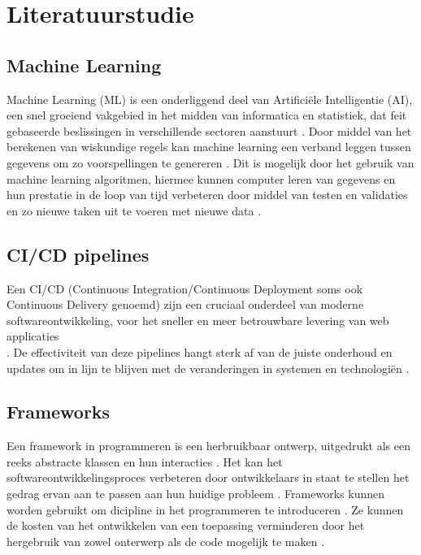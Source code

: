 
\section{Literatuurstudie}%
\label{sec:state-of-the-art}

\subsection{Machine Learning}
Machine Learning (ML) is een onderliggend deel van Artificiële Intelligentie (AI), een snel groeiend vakgebied in het midden van informatica en statistiek, dat feit gebaseerde beslissingen in verschillende sectoren aanstuurt \autocite{Jordan2015}.
Door middel van het berekenen van wiskundige regels kan machine learning een verband leggen tussen gegevens om zo voorspellingen te genereren \autocite{Cybenko2001}.
Dit is mogelijk door het gebruik van machine learning algoritmen, hiermee kunnen computer leren van gegevens en hun prestatie in de loop van tijd verbeteren door middel van testen en validaties en zo nieuwe taken uit te voeren met nieuwe data \autocite{Shaveta2023}.
\subsection{CI/CD pipelines}
Een CI/CD (Continuous Integration/Continuous Deployment soms ook Continuous Delivery genoemd) zijn een cruciaal onderdeel van moderne softwareontwikkeling, voor het sneller en meer betrouwbare levering van web applicaties\\ \autocite{Singh2023}.
De effectiviteit van deze pipelines hangt sterk af van de juiste onderhoud en updates om in lijn te blijven met de veranderingen in systemen en technologiën \autocite{Zampetti2021}.
\subsection{Frameworks}
Een framework in programmeren is een herbruikbaar ontwerp, uitgedrukt als een reeks abstracte klassen en hun interacties \autocite{JuhaHautamaeki1997}. Het kan het softwareontwikkelingsproces verbeteren door ontwikkelaars in staat te stellen het gedrag ervan aan te passen aan hun huidige probleem \autocite{JuhaHautamaeki1997}. Frameworks kunnen worden gebruikt om dicipline in het programmeren te introduceren \autocite{PeiHsia1980}. Ze kunnen de kosten van het ontwikkelen van een toepassing verminderen door het hergebruik van zowel onterwerp als de code mogelijk te maken \autocite{DonRoberts2004}.

